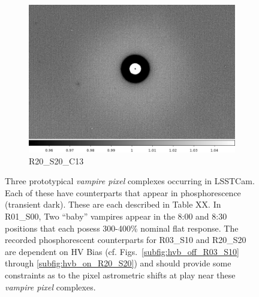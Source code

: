 \begin{figure}[!htbp]
\begin{subfigure}{0.3\textwidth}
     \includegraphics[width=\textwidth]{figures/vamp_desc/vamp_desc_ffresp_R20S20.png} 
     \caption{R20\_S20\_C13}
     \label{subfig:vamp_desc_R20_S20}
 \end{subfigure}  
 \newline
\caption{Three prototypical {\it vampire pixel} complexes occurring in LSSTCam. Each of these have counterparts that appear in phosphorescence (transient dark). These are each described in Table XX. In R01\_S00, Two ``baby'' vampires appear in the 8:00 and 8:30 positions that each posess 300-400\% nominal flat response. The recorded phosphorescent counterparts for R03\_S10 and R20\_S20 are dependent on HV Bias (cf. Figs.~\ref{subfig:hvb_off_R03_S10} through \ref{subfig:hvb_on_R20_S20}) and should provide some constraints as to the pixel astrometric shifts at play near these {\it vampire pixel} complexes.}
\label{fig:vamp:ffresp}
\end{figure}



